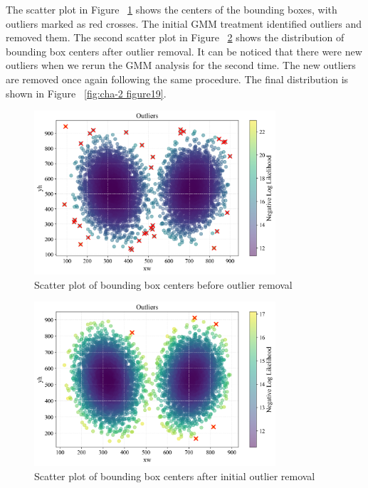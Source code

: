 The scatter plot in Figure ~\ref{fig:cha-2 figure17} shows the centers of the bounding boxes, with outliers marked as red crosses. The initial GMM treatment identified outliers and removed them. The second scatter plot in Figure ~\ref{fig:cha-2 figure18} shows the distribution of bounding box centers after outlier removal. It can be noticed that there were new outliers when we rerun the GMM analysis for the second time. The new outliers are removed once again following the same procedure. The final distribution is shown in Figure ~\ref{fig:cha-2 figure19}.

\begin{figure}[H]
    \begin{center}
        \includegraphics[width = 0.8\textwidth]{figures/Figure20.png}
        \caption{Scatter plot of bounding box centers before outlier removal}
        \label{fig:cha-2 figure17}
    \end{center}
\end{figure}

\begin{figure}[H]
    \begin{center}
        \includegraphics[width = 0.8\textwidth]{figures/Figure21.png}
        \caption{Scatter plot of bounding box centers after initial outlier removal}
        \label{fig:cha-2 figure18}
    \end{center}
\end{figure}

